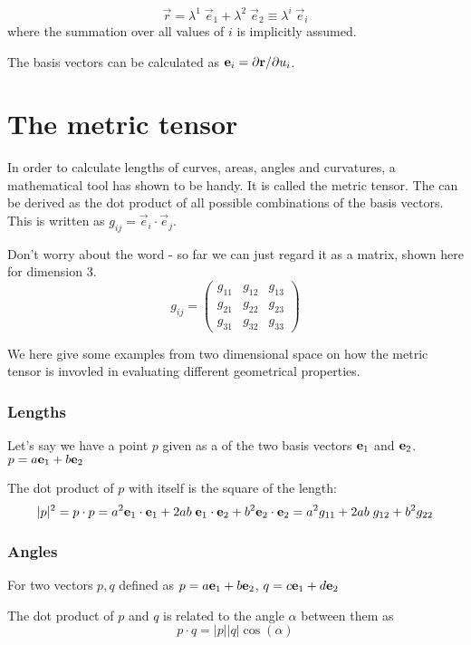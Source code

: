 $$
    \vec{r} = \lambda^1\;\vec{e}_1 + \lambda^2\;\vec{e}_2 \equiv \lambda^i\;\vec{e}_i 
$$
where the summation over all values of $i$ is implicitly assumed.

The basis vectors can be calculated as $\mathbf{e}_i = \partial\mathbf{\mathbf{r}}/\partial u_i$. 

\section{The metric tensor}
In order to calculate lengths of curves, areas, angles and curvatures, a mathematical tool 
has shown to be handy. It is called the metric tensor. The  can
be derived as the dot product of all possible combinations of the basis vectors.
This is written as $g_{ij} =\vec{e}_i\cdot\vec{e}_j$.

Don't worry about the word  - so far we can just regard it as a matrix, shown here 
for dimension 3.
$$
   g_{ij} = \begin{pmatrix}
              g_{11} & g_{12} & g_{13} \\
              g_{21} & g_{22} & g_{23} \\
              g_{31} & g_{32} & g_{33} 
            \end{pmatrix}
$$



\vspace{0.5cm}
We here give some examples from two dimensional space on how the metric tensor is invovled in 
evaluating different geometrical properties.

\subsubsection{Lengths}

Let's say we have a point $p$ given as a  of the two 
basis vectors $\mathbf{e}_1$ and $\mathbf{e}_2$. $p=a \mathbf{e}_1 + b \mathbf{e}_2$

The dot product of $p$ with itself is the square of the length: 
$$
|p|^2 = p\cdot p = a^2 \mathbf{e}_1\cdot\mathbf{e}_1 + 2ab\;\mathbf{e}_1\cdot\mathbf{e}_2 + b^2 \mathbf{e}_2\cdot\mathbf{e}_2
= a^2 g_{11} + 2ab\; g_{12} + b^2 g_{22}
$$


\subsubsection{Angles}
For two vectors $p,q$ defined as 
$p=a \mathbf{e}_1 + b \mathbf{e}_2$, $q=c \mathbf{e}_1 + d \mathbf{e}_2$

The dot product of $p$ and $q$ is related to the angle $\alpha$ between them as
$$
  p \cdot q = |p| |q| \cos(\alpha) 
$$

